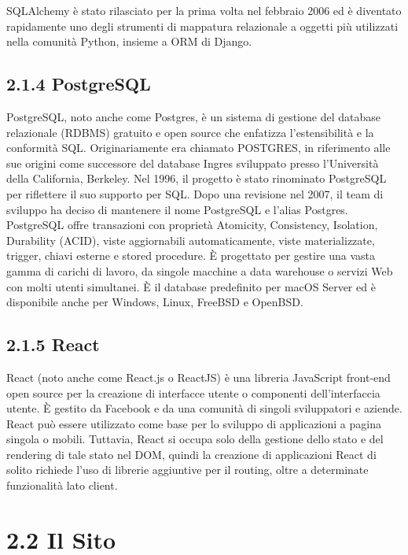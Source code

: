 SQLAlchemy è stato rilasciato per la prima volta nel febbraio 2006 ed è diventato rapidamente uno degli strumenti di mappatura relazionale a oggetti più utilizzati nella comunità Python, insieme a ORM di Django.


\subsection*{2.1.4 \hspace{1cm} PostgreSQL}
PostgreSQL, noto anche come Postgres, è un sistema di gestione del database relazionale (RDBMS) gratuito e open source che enfatizza l'estensibilità e la conformità SQL. Originariamente era chiamato POSTGRES, in riferimento alle sue origini come successore del database Ingres sviluppato presso l'Università della California, Berkeley. Nel 1996, il progetto è stato rinominato PostgreSQL per riflettere il suo supporto per SQL. Dopo una revisione nel 2007, il team di sviluppo ha deciso di mantenere il nome PostgreSQL e l'alias Postgres. \\

PostgreSQL offre transazioni con proprietà Atomicity, Consistency, Isolation, Durability (ACID), viste aggiornabili automaticamente, viste materializzate, trigger, chiavi esterne e stored procedure. È progettato per gestire una vasta gamma di carichi di lavoro, da singole macchine a data warehouse o servizi Web con molti utenti simultanei. È il database predefinito per macOS Server ed è disponibile anche per Windows, Linux, FreeBSD e OpenBSD. 

\subsection*{2.1.5 \hspace{1cm} React}
React (noto anche come React.js o ReactJS) è una libreria JavaScript front-end open source per la creazione di interfacce utente o componenti dell'interfaccia utente. È gestito da Facebook e da una comunità di singoli sviluppatori e aziende. React può essere utilizzato come base per lo sviluppo di applicazioni a pagina singola o mobili. Tuttavia, React si occupa solo della gestione dello stato e del rendering di tale stato nel DOM, quindi la creazione di applicazioni React di solito richiede l'uso di librerie aggiuntive per il routing, oltre a determinate funzionalità lato client. \\

\section*{2.2 \hspace{1cm} Il Sito}
